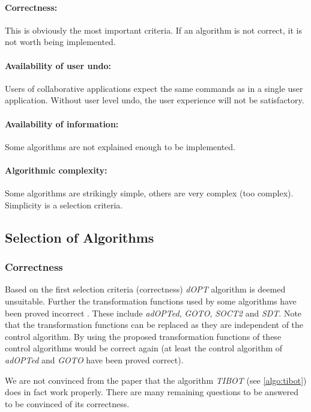 \paragraph{Correctness:} This is obviously the most important criteria. If an algorithm is not correct, it is not worth being implemented.

\paragraph{Availability of user undo:} Users of collaborative applications expect the same commands as in a single user application. Without user level undo, the user experience will not be satisfactory.

\paragraph{Availability of information:} Some algorithms are not explained enough to be implemented.

\paragraph{Algorithmic complexity:} Some algorithms are strikingly simple, others are very complex (too complex). Simplicity is a selection criteria.


\subsection{Selection of Algorithms}

\subsubsection{Correctness}
Based on the first selection criteria (correctness) \emph{dOPT} algorithm is deemed unsuitable. Further the transformation functions used by some algorithms have been proved incorrect \cite{imine04}. These include \emph{adOPTed}, \emph{GOTO}, \emph{SOCT2} and \emph{SDT}. Note that the transformation functions can be replaced as they are independent of the control algorithm. By using the proposed transformation functions of \cite{imine04} these control algorithms would be correct again (at least the control algorithm of \emph{adOPTed} and \emph{GOTO} have been proved correct). 

We are not convinced from the paper \cite{tibot} that the algorithm \emph{TIBOT} (see \ref{algo:tibot}) does in fact work properly. There are many remaining questions to be answered to be convinced of its correctness.


